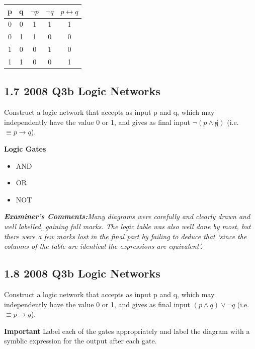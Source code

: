\documentclass[]{report}
\begin{document}
\begin{tabular}{|c|c|c|c|c|}
\hline  p& q & $\neg p$ & $\neg q$ & $p \leftrightarrow q$ \\ 
\hline  0& 0 & 1& 1 & 1\\ 
\hline  0& 1 &  1& 0& 0\\ 
\hline  1& 0 &  0& 1& 0\\ 
\hline  1& 1 &  0 & 0& 1\\ 
\hline 
\end{tabular} 
\newpage
\subsection*{1.7 2008 Q3b Logic Networks }

Construct a logic network that accepts as input p and q, which may independently have the value 0 or 1, and
gives as final input $\neg(p \wedge \not q)$ (i.e. $\equiv p \rightarrow q$).\\
\bigskip

\textbf{Logic Gates}
\begin{itemize}
\item AND
\item OR
\item NOT
\end{itemize}
\bigskip

\emph{\textbf{Examiner's Comments:}Many
diagrams were carefully and clearly drawn and well labelled, gaining full
marks. The logic table was also well done by most, but there were a few marks
lost in the final part by failing to deduce that ‘since the columns of the table are
identical the expressions are equivalent’.}

\subsection*{1.8 2008 Q3b Logic Networks }
Construct a logic network that accepts as input p and q, which may independently have the value 0 or 1, and
gives as final input $(p \wedge  q) \vee \neg q$ (i.e. $\equiv p \rightarrow q$).



\textbf{Important} Label each of the gates appropriately and label the diagram with a symblic expression for the output after each gate.
\end{document}
